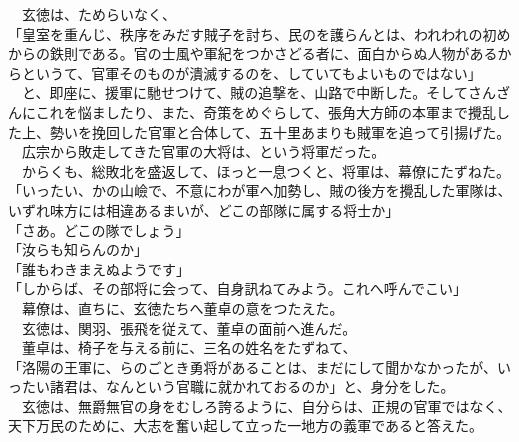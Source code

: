 \documentclass[
  paper=a5,
  fontsize=10pt,
  jafontsize=9.5pt,
  tate,                  %
  open_bracket_pos=nibu, %
]{jlreq}
\begin{document}
　玄徳は、ためらいなく、\\


「皇室を重んじ、秩序をみだす賊子を討ち、民のを護らんとは、われわれの初めからの鉄則である。官の士風や軍紀をつかさどる者に、面白からぬ人物があるからというて、官軍そのものが潰滅するのを、していてもよいものではない」\\


　と、即座に、援軍に馳せつけて、賊の追撃を、山路で中断した。そしてさんざんにこれを悩ましたり、また、奇策をめぐらして、張角大方師の本軍まで攪乱した上、勢いを挽回した官軍と合体して、五十里あまりも賊軍を追って引揚げた。\\


　広宗から敗走してきた官軍の大将は、という将軍だった。\\


　からくも、総敗北を盛返して、ほっと一息つくと、将軍は、幕僚にたずねた。\\


「いったい、かの山嶮で、不意にわが軍へ加勢し、賊の後方を攪乱した軍隊は、いずれ味方には相違あるまいが、どこの部隊に属する将士か」\\


「さあ。どこの隊でしょう」\\


「汝らも知らんのか」\\


「誰もわきまえぬようです」\\


「しからば、その部将に会って、自身訊ねてみよう。これへ呼んでこい」\\


　幕僚は、直ちに、玄徳たちへ董卓の意をつたえた。\\


　玄徳は、関羽、張飛を従えて、董卓の面前へ進んだ。\\


　董卓は、椅子を与える前に、三名の姓名をたずねて、\\


「洛陽の王軍に、らのごとき勇将があることは、まだにして聞かなかったが、いったい諸君は、なんという官職に就かれておるのか」と、身分をした。\\


　玄徳は、無爵無官の身をむしろ誇るように、自分らは、正規の官軍ではなく、天下万民のために、大志を奮い起して立った一地方の義軍であると答えた。\\
\end{document}
